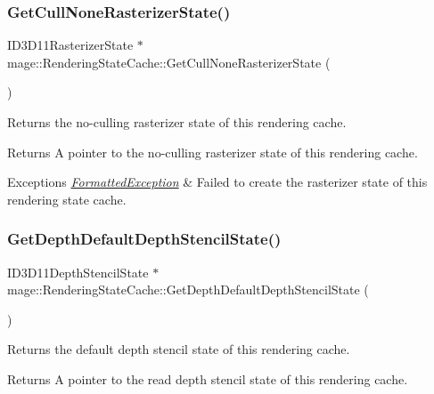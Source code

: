 \subsubsection{\texorpdfstring{Get\+Cull\+None\+Rasterizer\+State()}{GetCullNoneRasterizerState()}}
{\footnotesize\ttfamily I\+D3\+D11\+Rasterizer\+State $\ast$ mage\+::\+Rendering\+State\+Cache\+::\+Get\+Cull\+None\+Rasterizer\+State (\begin{DoxyParamCaption}{ }\end{DoxyParamCaption})}

Returns the no-\/culling rasterizer state of this rendering cache.

\begin{DoxyReturn}{Returns}
A pointer to the no-\/culling rasterizer state of this rendering cache. 
\end{DoxyReturn}

\begin{DoxyExceptions}{Exceptions}
{\em \hyperlink{structmage_1_1_formatted_exception}{Formatted\+Exception}} & Failed to create the rasterizer state of this rendering state cache. \\
\hline
\end{DoxyExceptions}
\hypertarget{structmage_1_1_rendering_state_cache_aaa928ab554db5e83354bca7f7d82308d}{}\label{structmage_1_1_rendering_state_cache_aaa928ab554db5e83354bca7f7d82308d} 
\subsubsection{\texorpdfstring{Get\+Depth\+Default\+Depth\+Stencil\+State()}{GetDepthDefaultDepthStencilState()}}
{\footnotesize\ttfamily I\+D3\+D11\+Depth\+Stencil\+State $\ast$ mage\+::\+Rendering\+State\+Cache\+::\+Get\+Depth\+Default\+Depth\+Stencil\+State (\begin{DoxyParamCaption}{ }\end{DoxyParamCaption})}

Returns the default depth stencil state of this rendering cache.

\begin{DoxyReturn}{Returns}
A pointer to the read depth stencil state of this rendering cache. 
\end{DoxyReturn}

